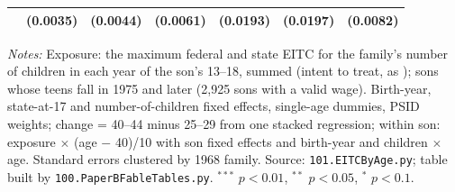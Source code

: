 \begin{table}[!htbp]
{{\begin{tabular}{lcccccc}
 & (0.0035) & (0.0044) & (0.0061) & (0.0193) & (0.0197) & (0.0082) \\
\bottomrule
\end{tabular}}}
\par\smallskip
\begin{minipage}{\textwidth}\footnotesize \textit{Notes:} Exposure: the maximum federal and state EITC for the family's number of children in each year of the son's 13--18, summed (intent to treat, as \citet{bastian2018long}); sons whose teens fall in 1975 and later (2,925 sons with a valid wage). Birth-year, state-at-17 and number-of-children fixed effects, single-age dummies, PSID weights; change = 40--44 minus 25--29 from one stacked regression; within son: exposure $\times$ (age $-$ 40)/10 with son fixed effects and birth-year and children $\times$ age. Standard errors clustered by 1968 family. Source: \texttt{101.EITCByAge.py}; table built by \texttt{100.PaperBFableTables.py}. $^{***}$ $p<0.01$, $^{**}$ $p<0.05$, $^{*}$ $p<0.1$.\end{minipage}
\end{table}
